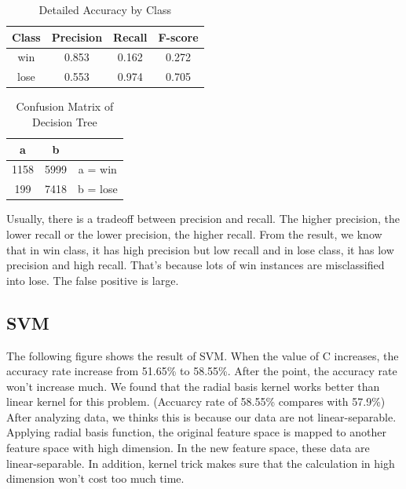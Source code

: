 \begin{table}
\begin{center}
\begin{tabular}{|c|c|c|c|}
\hline
Class & Precision & Recall & F-score \\ \hline
win & 0.853 & 0.162 & 0.272 \\ \hline
lose & 0.553 & 0.974 & 0.705 \\ \hline
\end{tabular}
\caption{Detailed Accuracy by Class}
\label{table:dtreeaccuracy}
\end{center}
\end{table}

\begin{table}
\begin{center}
\begin{tabular}{|c|c|c|}
\hline
a & b & \\ \hline
1158 & 5999 & a = win \\ \hline
199 & 7418 & b = lose \\ \hline
\end{tabular}
\caption{Confusion Matrix of Decision Tree}
\label{table:dtreeconfusionmatrix}
\end{center}
\end{table}


Usually, there is a tradeoff between precision and recall. The higher precision, the lower recall or the lower precision, the higher recall. From the result, we know that in win class, it has high precision but low recall and in lose class, it has low precision and high recall. That's because lots of win instances are misclassified into lose. The false positive is large.

\subsection{SVM}

The following figure shows the result of SVM. When the value of C increases, the accuracy rate increase from 51.65\% to 58.55\%. After the point, the accuracy rate won't increase much. We found that the radial basis kernel works better than linear kernel for this problem. (Accuarcy rate of 58.55\% compares with 57.9\%) After analyzing data, we thinks this is because our data are not linear-separable. Applying radial basis function, the original feature space is mapped to another feature space with high dimension. In the new feature space, these data are linear-separable. In addition, kernel trick makes sure that the calculation in high dimension won’t cost too much time.

